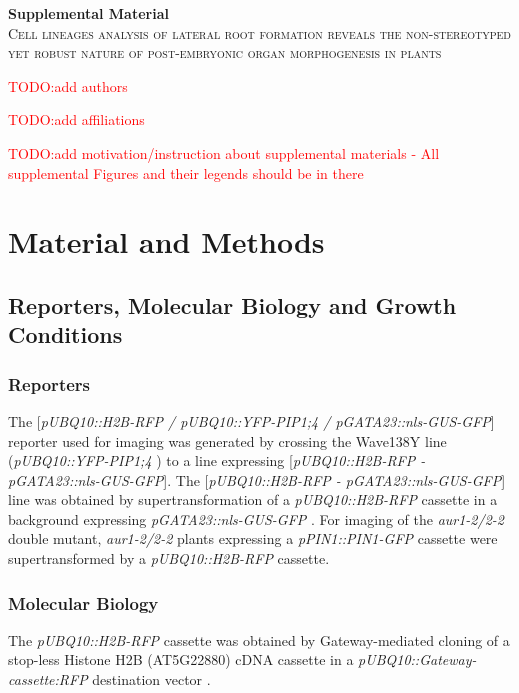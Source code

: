 \documentclass[11pt,a4paper, draft]{article}
\newcommand{\TODO}[1]{
\textcolor{red}{TODO:#1}
}
\def\baselinestretch{1.0}
\begin{document}
\begin{center}\large
\textbf{Supplemental Material}\\[1em]

\textsc{Cell lineages analysis of lateral root formation reveals the non-stereotyped yet robust nature of post-embryonic organ morphogenesis in plants}

\TODO{add authors}

\TODO{add affiliations}

\end{center}

\setcounter{tocdepth}{2}
\renewcommand{\baselinestretch}{0.5}\normalsize
\tableofcontents
\renewcommand{\baselinestretch}{1}\normalsize

%

\noindent
\TODO{add motivation/instruction about supplemental materials - All supplemental Figures and their legends should be in there}
\clearpage
\section{Material and Methods}
\subsection{Reporters, Molecular Biology and Growth Conditions}
\subsubsection{Reporters}
The [\emph{pUBQ10::H2B-RFP / pUBQ10::YFP-PIP1;4 / pGATA23::nls-GUS-GFP}] reporter used for imaging was generated by crossing the Wave138Y line (\emph{pUBQ10::YFP-PIP1;4} \cite{Geldner:2009bc}) to a line expressing [\emph{pUBQ10::H2B-RFP - pGATA23::nls-GUS-GFP}]. The [\emph{pUBQ10::H2B-RFP - pGATA23::nls-GUS-GFP}] line was obtained by supertransformation of a \emph{pUBQ10::H2B-RFP }cassette in a background expressing \emph{pGATA23::nls-GUS-GFP} \cite{DeRybel:2010ic}. For imaging of the \emph{aur1-2/2-2} double mutant, \emph{aur1-2/2-2} plants expressing a \emph{pPIN1::PIN1-GFP} cassette \cite{Lucas11032013} were supertransformed by a \emph{pUBQ10::H2B-RFP} cassette. 

\subsubsection{Molecular Biology}
The \emph{pUBQ10::H2B-RFP }cassette was obtained by Gateway-mediated cloning of a stop-less Histone H2B (AT5G22880) cDNA cassette in a \emph{pUBQ10::\emph{Gateway-cassette}:RFP }destination vector \cite{Grefen:2010ho}.
\end{document}
